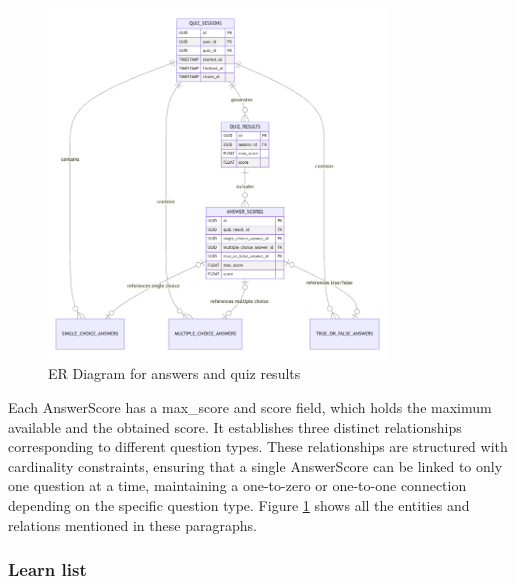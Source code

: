 \begin{figure}[H]
    \centering
    \includegraphics[width=0.8\textwidth, keepaspectratio]{figures/er-quiz-result.png}
    \caption{ER Diagram for answers and quiz results}
    \label{fig:er-quiz-result}
\end{figure}

Each AnswerScore has a max\_score and score field, which holds the maximum available and the obtained score. It establishes three distinct relationships corresponding to different question types. These relationships are structured with cardinality constraints, ensuring that a single AnswerScore can be linked to only one question at a time, maintaining a one-to-zero or one-to-one connection depending on the specific question type. Figure \ref{fig:er-quiz-result} shows all the entities and relations mentioned in these paragraphs.

\subsubsection{Learn list}

